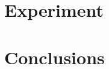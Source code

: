 \documentclass[letterpaper, 10 pt, conference]{ieeeconf}  %
\begin{document}
\section{Experiment} \label{sec:exps}
\section{Conclusions} \label{sec:concs}

\newpage

%
%
%


  
  





\end{document}
